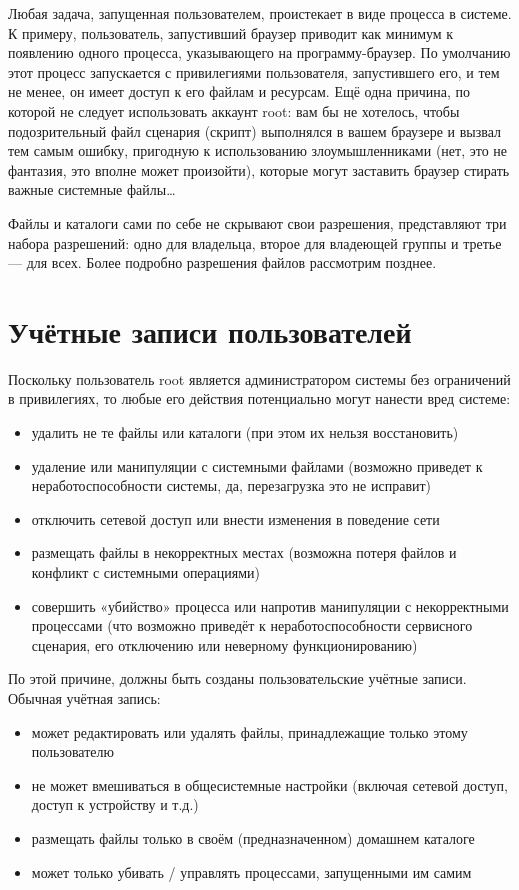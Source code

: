 \documentclass[12pt]{book}
\begin{document}
Любая задача, запущенная пользователем, проистекает в виде процесса  в системе. К примеру,  пользователь, запустивший браузер приводит как минимум к появлению одного процесса, указывающего на программу-браузер. По умолчанию этот процесс запускается с привилегиями пользователя, запустившего его, и тем не менее, он имеет доступ к его файлам и ресурсам. Ещё одна причина, по которой не следует использовать аккаунт root: вам бы не хотелось, чтобы подозрительный файл сценария (скрипт) выполнялся в вашем браузере и вызвал тем самым ошибку, пригодную к использованию злоумышленниками (нет, это не фантазия, это вполне может произойти), которые могут заставить браузер стирать важные системные файлы\ldots

Файлы и каталоги сами по себе не скрывают свои разрешения, представляют три набора разрешений: одно для владельца, второе для владеющей группы и третье — для всех. Более подробно разрешения файлов рассмотрим позднее.

\section{Учётные записи пользователей}

Поскольку пользователь root является администратором системы без ограничений в привилегиях, то любые его действия потенциально могут нанести вред системе:

\begin{itemize}
	\item удалить не те файлы или каталоги (при этом их нельзя восстановить)
	\item удаление или манипуляции с системными файлами (возможно приведет к неработоспособности системы, да, перезагрузка это не исправит)
	\item отключить сетевой доступ или внести изменения в поведение сети
	\item размещать файлы в некорректных местах (возможна потеря файлов и конфликт с системными операциями)
	\item совершить «убийство» процесса или напротив манипуляции с некорректными процессами (что возможно приведёт к неработоспособности сервисного сценария, его отключению или неверному функционированию)
\end{itemize}

По этой причине, должны быть созданы пользовательские учётные записи. Обычная учётная запись:

\begin{itemize}
	\item может редактировать или удалять файлы, принадлежащие только этому пользователю
	\item не может вмешиваться в общесистемные настройки (включая сетевой доступ, доступ к устройству и т.д.)
	\item размещать файлы только в своём (предназначенном) домашнем каталоге
	\item может только убивать / управлять процессами, запущенными им самим
\end{itemize}
\end{document}
